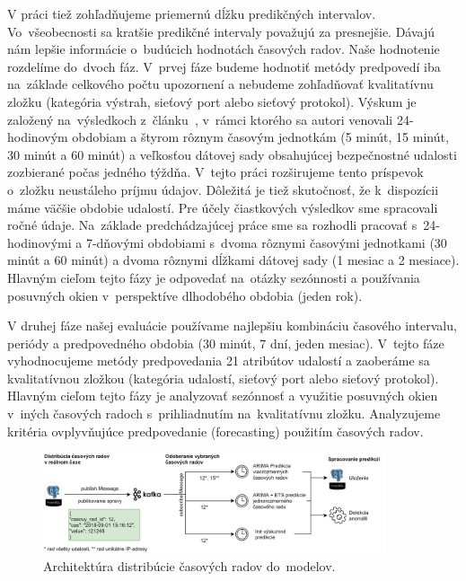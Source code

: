 \documentclass[thesismargins, thesislinespacing, openright, upjsfrontpage]{rnthesis}
\begin{document}
V práci tiež zohľadňujeme priemernú dĺžku predikčných intervalov. Vo~všeobecnosti sa kratšie predikčné intervaly považujú za presnejšie. Dávajú nám lepšie informácie o~budúcich hodnotách časových radov. Naše hodnotenie rozdelíme do~dvoch fáz. V~prvej fáze budeme hodnotiť metódy predpovedí iba na~základe celkového počtu upozornení a nebudeme zohľadňovať kvalitatívnu zložku (kategória výstrah, sieťový port alebo sieťový protokol). Výskum je založený na~výsledkoch z~článku~\cite{new_paper}, v~rámci ktorého sa autori venovali 24-hodinovým obdobiam a štyrom rôznym časovým jednotkám (5 minút, 15 minút, 30 minút a 60 minút) a veľkosťou dátovej sady obsahujúcej bezpečnostné udalosti zozbierané počas jedného týždňa. V~tejto práci rozširujeme tento príspevok o~zložku neustáleho príjmu údajov. Dôležitá je tiež skutočnosť, že k~dispozícii máme väčšie obdobie udalostí. Pre účely čiastkových výsledkov sme spracovali ročné údaje. Na~základe predchádzajúcej práce sme sa rozhodli pracovať s~24-hodinovými a 7-dňovými obdobiami s~dvoma rôznymi časovými jednotkami (30 minút a 60 minút) a dvoma rôznymi dĺžkami dátovej sady (1 mesiac a 2 mesiace). Hlavným cieľom tejto fázy je odpovedať na~otázky sezónnosti a používania posuvných okien v~perspektíve dlhodobého obdobia (jeden rok).

V druhej fáze našej evaluácie používame najlepšiu kombináciu časového intervalu, periódy a predpovedného obdobia (30 minút, 7 dní, jeden mesiac). V~tejto fáze vyhodnocujeme metódy predpovedania 21 atribútov udalostí a zaoberáme sa kvalitatívnou zložkou (kategória udalostí, sieťový port alebo sieťový protokol). Hlavným cieľom tejto fázy je analyzovať sezónnosť a využitie posuvných okien v~iných časových radoch s~prihliadnutím na~kvalitatívnu zložku. Analyzujeme kritéria ovplyvňujúce predpovedanie (forecasting) použitím časových radov.


\begin{figure}[h]
  \centering
  \includegraphics[width=0.9\textwidth]{images/metodologia2.png}
  \caption{Architektúra distribúcie časových radov do~modelov.}
  \label{fig:c2_schema}
\end{figure}
\end{document}
